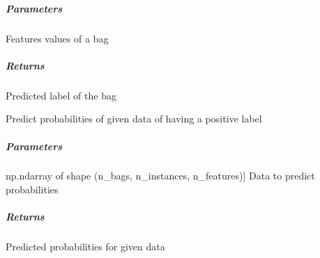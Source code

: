 \documentclass[letterpaper,10pt,english]{sphinxmanual}
\begin{document}
\begin{fulllineitems}
\begin{fulllineitems}
\subparagraph{Parameters}
\label{\detokenize{classifier/mi/_autosummary/miml.classifier.mi.mi_wrapper_classifier.MIWrapperClassifier:id1}}\begin{description}
\sphinxAtStartPar
Features values of a bag

\end{description}


\subparagraph{Returns}
\label{\detokenize{classifier/mi/_autosummary/miml.classifier.mi.mi_wrapper_classifier.MIWrapperClassifier:returns}}\begin{description}
\sphinxAtStartPar
Predicted label of the bag

\end{description}

\end{fulllineitems}


\begin{fulllineitems}
\label{\detokenize{classifier/mi/_autosummary/miml.classifier.mi.mi_wrapper_classifier.MIWrapperClassifier:miml.classifier.mi.mi_wrapper_classifier.MIWrapperClassifier.predict_proba}}
\pysigstartsignatures
{}
\pysigstopsignatures
\sphinxAtStartPar
Predict probabilities of given data of having a positive label


\subparagraph{Parameters}
\label{\detokenize{classifier/mi/_autosummary/miml.classifier.mi.mi_wrapper_classifier.MIWrapperClassifier:id2}}\begin{description}
\sphinxlineitem{x\_test}{[}np.ndarray of shape (n\_bags, n\_instances, n\_features){]}
\sphinxAtStartPar
Data to predict probabilities

\end{description}


\subparagraph{Returns}
\label{\detokenize{classifier/mi/_autosummary/miml.classifier.mi.mi_wrapper_classifier.MIWrapperClassifier:id3}}\begin{description}
\sphinxAtStartPar
Predicted probabilities for given data

\end{description}

\end{fulllineitems}


\end{fulllineitems}
\end{document}
